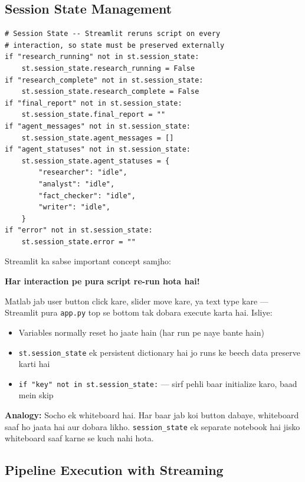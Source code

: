 \documentclass[12pt, a4paper]{article}
\begin{document}
\subsection{Session State Management}

\begin{lstlisting}[style=pythonstyle, title={\color{accentgreen}\faIcon{file} Session State Initialization}]
# Session State -- Streamlit reruns script on every
# interaction, so state must be preserved externally
if "research_running" not in st.session_state:
    st.session_state.research_running = False
if "research_complete" not in st.session_state:
    st.session_state.research_complete = False
if "final_report" not in st.session_state:
    st.session_state.final_report = ""
if "agent_messages" not in st.session_state:
    st.session_state.agent_messages = []
if "agent_statuses" not in st.session_state:
    st.session_state.agent_statuses = {
        "researcher": "idle",
        "analyst": "idle",
        "fact_checker": "idle",
        "writer": "idle",
    }
if "error" not in st.session_state:
    st.session_state.error = ""
\end{lstlisting}

\begin{conceptbox}[title={\faIcon{brain} ~Streamlit Ka Execution Model}]
Streamlit ka sabse important concept samjho:

\textbf{Har interaction pe pura script re-run hota hai!}

Matlab jab user button click kare, slider move kare, ya text type kare --- Streamlit pura \texttt{app.py} top se bottom tak dobara execute karta hai. Isliye:
\begin{itemize}
\item Variables normally reset ho jaate hain (har run pe naye bante hain)
\item \texttt{st.session\_state} ek persistent dictionary hai jo runs ke beech data preserve karti hai
\item \texttt{if "key" not in st.session\_state:} --- sirf pehli baar initialize karo, baad mein skip
\end{itemize}

\textbf{Analogy:} Socho ek whiteboard hai. Har baar jab koi button dabaye, whiteboard saaf ho jaata hai aur dobara likho. \texttt{session\_state} ek separate notebook hai jisko whiteboard saaf karne se kuch nahi hota.
\end{conceptbox}

\subsection{Pipeline Execution with Streaming}
\end{document}
